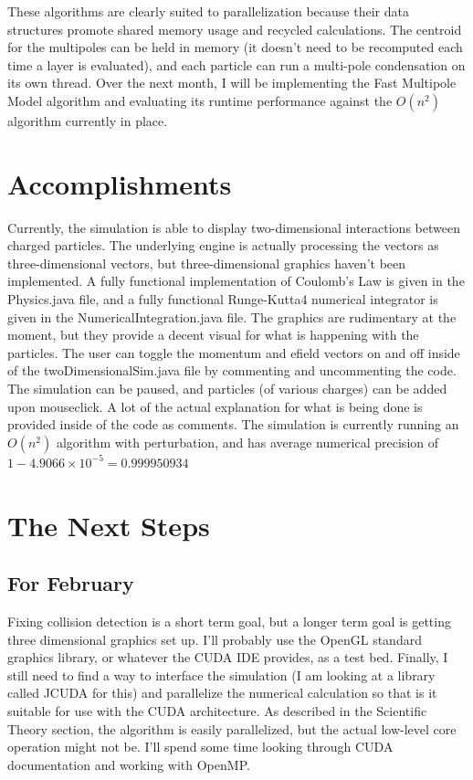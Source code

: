 \documentclass[10pt]{article}
\begin{document}
These algorithms are clearly suited to parallelization because their data structures promote shared memory usage and recycled calculations. The centroid for the multipoles can be held in memory (it doesn't need to be recomputed each time a layer is evaluated), and each particle can run a multi-pole condensation on its own thread. Over the next month, I will be implementing the Fast Multipole Model algorithm and evaluating its runtime performance against the $O(n^2)$ algorithm currently in place.

\clearpage
\section{Accomplishments}
Currently, the simulation is able to display two-dimensional interactions between charged particles. The underlying engine is actually processing the vectors as three-dimensional vectors, but three-dimensional graphics haven't been implemented. A fully functional implementation of Coulomb's Law is given in the Physics.java file, and a fully functional Runge-Kutta4 numerical integrator is given in the NumericalIntegration.java file. The graphics are rudimentary at the moment, but they provide a decent visual for what is happening with the particles. The user can toggle the momentum and efield vectors on and off inside of the twoDimensionalSim.java file by commenting and uncommenting the code. The simulation can be paused, and particles (of various charges) can be added upon mouseclick. A lot of the actual explanation for what is being done is provided inside of the code as comments. The simulation is currently running an $O(n^2)$ algorithm with perturbation, and has average numerical precision of $1 - 4.9066 \times 10^{-5} = 0.999950934$

\section{The Next Steps}
\subsection{For February}
Fixing collision detection is a short term goal, but a longer term goal is getting three dimensional graphics set up. I'll probably use the OpenGL standard graphics library, or whatever the CUDA IDE provides, as a test bed. Finally, I still need to find a way to interface the simulation (I am looking at a library called JCUDA for this) and parallelize the numerical calculation so that is it suitable for use with the CUDA architecture. As described in the Scientific Theory section, the algorithm is easily parallelized, but the actual low-level core operation might not be. I'll spend some time looking through CUDA documentation and working with OpenMP. 
\end{document}
